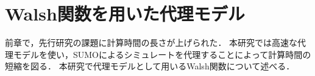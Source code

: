\documentclass[main]{subfiles}
\begin{document}
\chapter{Walsh関数を用いた代理モデル}
    前章で，先行研究の課題に計算時間の長さが上げられた．
    本研究では高速な代理モデルを使い，SUMOによるシミュレートを代理することによって計算時間の短縮を図る．
    本研究で代理モデルとして用いるWalsh関数について述べる．
    
    
\end{document}
